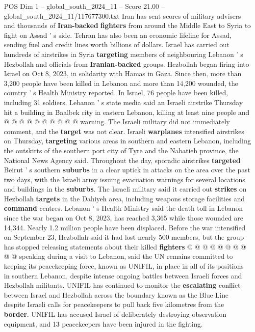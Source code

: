 \begin{textsample}{POS Dim 1 – global\_south\_2024\_11 – Score 21.00 – global\_south\_2024\_11/117677300.txt}
Iran has sent scores of military advisers and thousands of \textbf{Iran-backed} \textbf{fighters} from around the Middle East to Syria to fight on Assad ' s side.
Tehran has also been an economic lifeline for Assad, sending fuel and credit lines worth billions of dollars.
Israel has carried out hundreds of airstrikes in Syria \textbf{targeting} members of neighbouring Lebanon ' s Hezbollah and officials from \textbf{Iranian-backed} groups.
Hezbollah began firing into Israel on Oct 8, 2023, in solidarity with Hamas in Gaza.
Since then, more than 3,200 people have been killed in Lebanon and more than 14,200 wounded, the country ' s Health Ministry reported.
In Israel, 76 people have been killed, including 31 soldiers.
Lebanon ' s state media said an Israeli airstrike Thursday hit a building in Baalbek city in eastern Lebanon, killing at least nine people and @ @ @ @ @ @ @ @ @ @ warning.
The Israeli military did not immediately comment, and the \textbf{target} was not clear.
Israeli \textbf{warplanes} intensified airstrikes on Thursday, \textbf{targeting} various areas in southern and eastern Lebanon, including the outskirts of the southern port city of Tyre and the Nabatieh province, the National News Agency said.
Throughout the day, sporadic airstrikes \textbf{targeted} Beirut ' s southern \textbf{suburbs} in a clear uptick in attacks on the area over the past two days, with the Israeli army issuing evacuation warnings for several locations and buildings in the \textbf{suburbs}.
The Israeli military said it carried out \textbf{strikes} on Hezbollah \textbf{targets} in the Dahiyeh area, including weapons storage facilities and \textbf{command} centres.
Lebanon ' s Health Ministry said the death toll in Lebanon since the war began on Oct 8, 2023, has reached 3,365 while those wounded are 14,344.
Nearly 1.2 million people have been displaced.
Before the war intensified on September 23, Hezbollah said it had lost nearly 500 members, but the group has stopped releasing statements about their killed \textbf{fighters} @ @ @ @ @ @ @ @ @ @ speaking during a visit to Lebanon, said the UN remains committed to keeping its peacekeeping force, known as UNIFIL, in place in all of its positions in southern Lebanon, despite intense ongoing battles between Israeli forces and Hezbollah militants.
UNIFIL has continued to monitor the \textbf{escalating} conflict between Israel and Hezbollah across the boundary known as the Blue Line despite Israeli calls for peacekeepers to pull back five kilometres from the \textbf{border}.
UNIFIL has accused Israel of deliberately destroying observation equipment, and 13 peacekeepers have been injured in the fighting.

\end{textsample}
